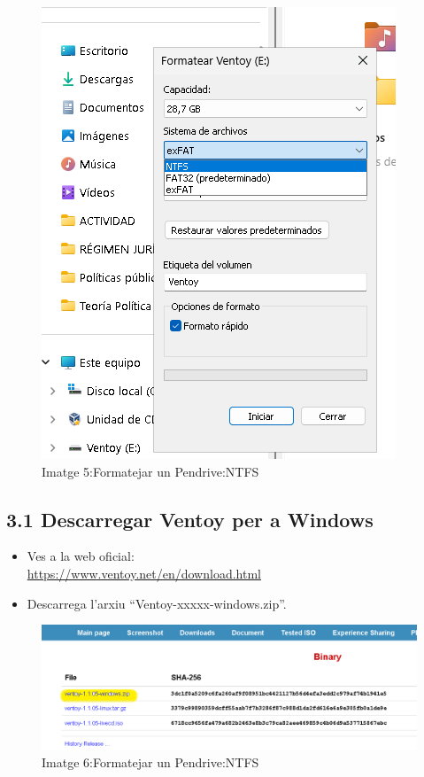 \documentclass[
  12 pt,
  a4paper,
]{article}
\begin{document}
\begin{figure}
\centering
\includegraphics{png/formatWindows2.png}
\caption{Imatge 5:Formatejar un Pendrive:NTFS}
\end{figure}

\subsection{3.1 Descarregar Ventoy per a
Windows}\label{descarregar-ventoy-per-a-windows}

\begin{itemize}
\item
  Ves a la web oficial:\\
  \url{https://www.ventoy.net/en/download.html}
\item
  Descarrega l'arxiu ``Ventoy-xxxxx-windows.zip''.
\end{itemize}

\begin{figure}
\centering
\includegraphics{png/zipDownload.png}
\caption{Imatge 6:Formatejar un Pendrive:NTFS}
\end{figure}
\end{document}
